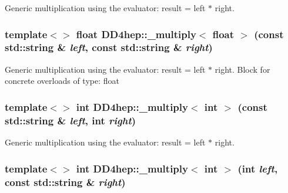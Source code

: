 Generic multiplication using the evaluator: result = left $\ast$ right. \hypertarget{group___d_d4_h_e_p___g_e_o_m_e_t_r_y_gaac33f3690327f7c9503ddc2d8a075e0f}{
\subsubsection[{\_\-multiply$<$ float $>$}]{\setlength{\rightskip}{0pt plus 5cm}template$<$$>$ float DD4hep::\_\-multiply$<$ float $>$ (const std::string \& {\em left}, \/  const std::string \& {\em right})}}
\label{group___d_d4_h_e_p___g_e_o_m_e_t_r_y_gaac33f3690327f7c9503ddc2d8a075e0f}


Generic multiplication using the evaluator: result = left $\ast$ right. Block for concrete overloads of type: float \hypertarget{group___d_d4_h_e_p___g_e_o_m_e_t_r_y_ga172a8b06e031748282218c39fd4aeeb9}{
\subsubsection[{\_\-multiply$<$ int $>$}]{\setlength{\rightskip}{0pt plus 5cm}template$<$$>$ int DD4hep::\_\-multiply$<$ int $>$ (const std::string \& {\em left}, \/  int {\em right})}}
\label{group___d_d4_h_e_p___g_e_o_m_e_t_r_y_ga172a8b06e031748282218c39fd4aeeb9}


Generic multiplication using the evaluator: result = left $\ast$ right. \hypertarget{group___d_d4_h_e_p___g_e_o_m_e_t_r_y_ga673bbee716fc3377cc75b9a68bb84d86}{
\subsubsection[{\_\-multiply$<$ int $>$}]{\setlength{\rightskip}{0pt plus 5cm}template$<$$>$ int DD4hep::\_\-multiply$<$ int $>$ (int {\em left}, \/  const std::string \& {\em right})}}
\label{group___d_d4_h_e_p___g_e_o_m_e_t_r_y_ga673bbee716fc3377cc75b9a68bb84d86}



